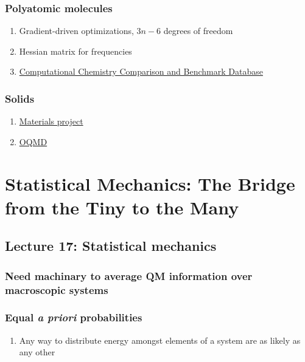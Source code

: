 \documentclass[11pt]{article}
\begin{document}
\subsubsection{Polyatomic molecules}
\label{sec:org52b4c9d}
\begin{enumerate}
\item Gradient-driven optimizations, \(3n-6\) degrees of freedom
\item Hessian matrix for frequencies
\item \href{https://cccbdb.nist.gov/}{Computational Chemistry Comparison and Benchmark Database}
\end{enumerate}
\subsubsection{Solids}
\label{sec:orgcbc8851}
\begin{enumerate}
\item \href{https://next-gen.materialsproject.org/}{Materials project}
\item \href{https://oqmd.org/}{OQMD}
\end{enumerate}
\section{Statistical Mechanics: The Bridge from the Tiny to the Many}
\label{sec:orgf5ecb9d}
\subsection{Lecture 17: Statistical mechanics}
\label{sec:org87ff3ab}
\subsubsection{Need machinary to average QM information over macroscopic systems}
\label{sec:org96d51bb}
\subsubsection{Equal \emph{a priori} probabilities}
\label{sec:org31e48f9}
\begin{enumerate}
\item Any way to distribute energy amongst elements of a system are as likely as any other
\end{enumerate}
\end{document}
